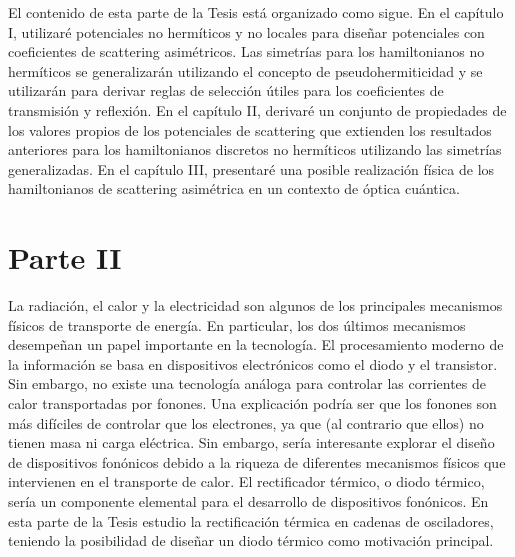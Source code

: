 El contenido de esta parte de la Tesis está organizado como sigue. En el capítulo I, utilizaré potenciales no hermíticos y no locales para diseñar potenciales con coeficientes de scattering asimétricos. Las simetrías para los hamiltonianos no hermíticos se generalizarán utilizando el concepto de pseudohermiticidad y se utilizarán para derivar reglas de selección útiles para los coeficientes de transmisión y reflexión. En el capítulo II, derivaré un conjunto de propiedades de los valores propios de los potenciales de scattering que extienden los resultados anteriores para los hamiltonianos discretos no hermíticos utilizando las simetrías generalizadas. En el capítulo III, presentaré una posible realización física de los hamiltonianos de scattering asimétrica en un contexto de óptica cuántica.


\section*{Parte II}


La radiación, el calor y la electricidad son algunos de los principales mecanismos físicos de transporte de energía. En particular, los dos últimos mecanismos desempeñan un papel importante en la tecnología. El procesamiento moderno de la información se basa en dispositivos electrónicos como el diodo y el transistor. Sin embargo, no existe una tecnología análoga para controlar las corrientes de calor transportadas por fonones. Una explicación podría ser que los fonones son más difíciles de controlar que los electrones, ya que (al contrario que ellos) no tienen masa ni carga eléctrica. Sin embargo, sería interesante explorar el diseño de dispositivos fonónicos debido a la riqueza de diferentes mecanismos físicos que intervienen en el transporte de calor. El rectificador térmico, o diodo térmico, sería un componente elemental para el desarrollo de dispositivos fonónicos. En esta parte de la Tesis estudio la rectificación térmica en cadenas de osciladores, teniendo la posibilidad de diseñar un diodo térmico como motivación principal.


